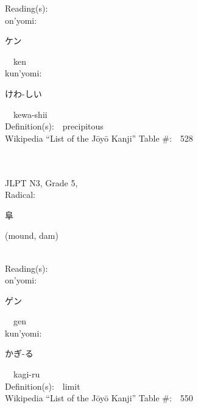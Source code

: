 \begin{multicols}{2}
Reading(s):\ \ \\
{\hspace*{1em}}on'yomi:\ \ \\
{\hspace*{2em}}{\begin{CJK}{UTF8}{min} ケン \end{CJK}}\ \ ken\ \ \\
{\hspace*{1em}}kun'yomi:\ \ \\
{\hspace*{2em}}{\begin{CJK}{UTF8}{min} けわ-しい \end{CJK}}\ \ kewa-shii\ \ \\
Definition(s):\ \ precipitous \\
Wikipedia ``List of the J\=oy\=o Kanji'' Table \#:\ \ 528 \\
\ \ \\
{\fontsize{34pt}{40pt}  }\ \ \\  %
{JLPT N3, Grade 5, \\Radical:\ \ {\begin{CJK}{UTF8}{min} 阜 \end{CJK}} (mound, dam) } \\
Reading(s):\ \ \\
{\hspace*{1em}}on'yomi:\ \ \\
{\hspace*{2em}}{\begin{CJK}{UTF8}{min} ゲン \end{CJK}}\ \ gen\ \ \\
{\hspace*{1em}}kun'yomi:\ \ \\
{\hspace*{2em}}{\begin{CJK}{UTF8}{min} かぎ-る \end{CJK}}\ \ kagi-ru\ \ \\
Definition(s):\ \ limit \\
Wikipedia ``List of the J\=oy\=o Kanji'' Table \#:\ \ 550 \\
\ \ \\
{\fontsize{34pt}{40pt}  }\ \ \\  %

\end{multicols}
